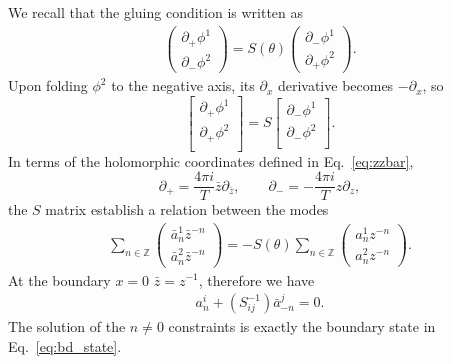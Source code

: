 We recall that the gluing condition is written as
\begin{equation}
\begin{aligned}
\label{eq:def_S_in_app}
\begin{pmatrix}
\partial_+\phi^1\\
\partial_-\phi^2
\end{pmatrix}
=S(\theta)
\begin{pmatrix}
\partial_-\phi^1\\
\partial_+\phi^2
\end{pmatrix}.
\end{aligned}
\end{equation}
Upon folding $\phi^2$ to the negative axis, its $\partial_x$ derivative becomes $-\partial_x$, so 
\begin{equation}
\begin{bmatrix}
\partial_{+} \phi^1 \\
\partial_{+} \phi^2 \\
\end{bmatrix}
 = S
\begin{bmatrix}
\partial_{-} \phi^1 \\
\partial_{-} \phi^2 \\
\end{bmatrix}.
\end{equation}
In terms of the holomorphic coordinates defined in Eq.~\eqref{eq:zzbar}, 
\begin{equation}
\partial_{+} = \frac{4\pi i }{T} \bar{z} \partial_{\bar{z}} ,\qquad \partial_{-} = -\frac{4\pi i }{T} z\partial_{z},
\end{equation}
the $S$ matrix establish a relation between the modes
\begin{equation}
\begin{aligned}
\label{eq:def_S_in_app_2}
\sum_{n\in\mathbb{Z}}
\begin{pmatrix}
\bar{a}_n^1\bar{z}^{-n}\\
\bar{a}_n^2\bar{z}^{-n}
\end{pmatrix}
= -S(\theta)
\sum_{n\in\mathbb{Z}}
\begin{pmatrix}
a_n^1{z}^{-n}\\
a_n^2{z}^{-n}
\end{pmatrix}.
\end{aligned}
\end{equation}
At the boundary $x = 0$ $\bar{z}=z^{-1}$, therefore we have
\begin{equation}
\begin{aligned}
a^i_n + (S^{-1}_{ij})\bar{a}^j_{-n}=0.
\end{aligned}
\end{equation}
The solution of the $n \ne 0$ constraints is exactly the boundary state in Eq.~\eqref{eq:bd_state}. 

